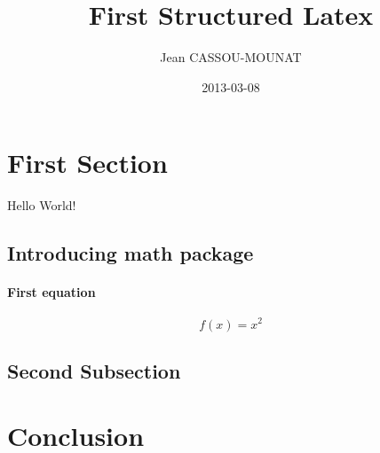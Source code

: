 \documentclass{article}
\title{First Structured Latex}
\date{2013-03-08}
\author{Jean CASSOU-MOUNAT}
\begin{document}
\maketitle
{}
\newpage
{}

\section{First Section}

Hello World!

\subsection{Introducing math package}

\paragraph{First equation}

\begin{equation*}
  f(x) = x^2
\end{equation*}

\subsection{Second Subsection}

\section{Conclusion}
\end{document}
